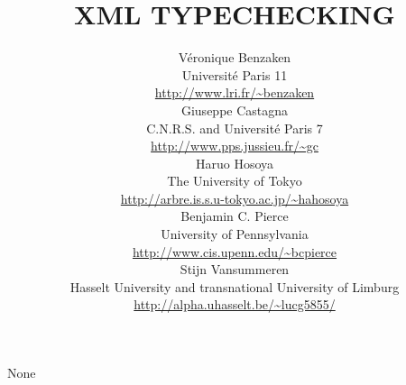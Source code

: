 \documentclass[twoside,leqno,onecolumn,pdftex]{article}
\begin{document}
\title{XML TYPECHECKING}
\author{     V\'eronique Benzaken  \\
         Universit\'e Paris 11\\
         \url{http://www.lri.fr/~benzaken}
         \\[2ex]
         Giuseppe Castagna \\
         C.N.R.S. and Universit\'e Paris 7\\
         \url{http://www.pps.jussieu.fr/~gc}
         \\[2ex]
         Haruo Hosoya \\
         The University of Tokyo \\
         \url{http://arbre.is.s.u-tokyo.ac.jp/~hahosoya}
         \\[2ex]
         Benjamin C. Pierce\\
         University of Pennsylvania \\
         \url{http://www.cis.upenn.edu/~bcpierce}
         \\[2ex]
         Stijn Vansummeren \\
         Hasselt University and transnational University of Limburg\\
         \url{http://alpha.uhasselt.be/~lucg5855/}
}
\date{}
\maketitle

\noindent
\begin{synonyms}
  None
\end{synonyms}
~\\\\
\end{document}

